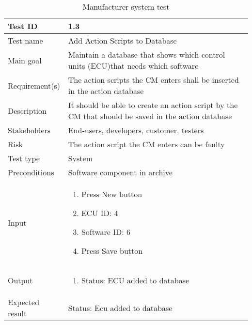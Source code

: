 \begin{table}[H]
\centering
\caption{Manufacturer system test}
\begin{tabularx}{1.0\textwidth}{
    |p{}     %
    |p{}|    %
}
\hline

Test ID
& 1.3
\\
\hline

Test name
& Add Action Scripts to Database
\\
\hline

Main goal
& Maintain a database that shows which control units (ECU)that needs which software
\\
\hline

Requirement(s)
& The  action  scripts  the  CM  enters  shall  be  inserted  in  the action database
\\
\hline

Description
& It should be able to create an action script by the CM that should be saved in the action database
\\
\hline

Stakeholders
& End-users, developers, customer, testers
\\
\hline

Risk
& The action script the CM enters can be faulty
\\
\hline

Test type
& System
\\
\hline

Preconditions
& Software component in archive
\\
\hline

Input
& \begin{enumerate}
    \item Press New button
    \item ECU ID: 4
    \item Software ID: 6
    \item Press Save button
\end{enumerate}
\\
\hline

Output
& \begin{enumerate}
    \item Status: ECU added to database
\end{enumerate}
\\
\hline

Expected result
& Status: Ecu added to database
\\
\hline


\end{tabularx}
\end{table}
